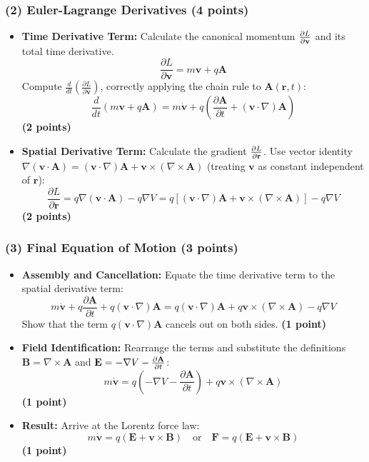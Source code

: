 \documentclass[11pt, a4paper]{article} %
\begin{document}
\subsubsection*{(2) Euler-Lagrange Derivatives (4 points)}
\begin{itemize}
    \item \textbf{Time Derivative Term:}
    Calculate the canonical momentum $\pdv{L}{\mathbf{v}}$ and its total time derivative.
    \[ \frac{\partial L}{\partial \mathbf{v}} = m\mathbf{v} + q\mathbf{A} \]
    Compute $\frac{d}{dt}(\frac{\partial L}{\partial \mathbf{v}})$, correctly applying the chain rule to $\mathbf{A}(\mathbf{r}, t)$:
    \[ \frac{d}{dt}(m\mathbf{v} + q\mathbf{A}) = m\dot{\mathbf{v}} + q\left( \frac{\partial \mathbf{A}}{\partial t} + (\mathbf{v} \cdot \nabla)\mathbf{A} \right) \]
    \hfill \textbf{(2 points)} \\

    \item \textbf{Spatial Derivative Term:}
    Calculate the gradient $\pdv{L}{\mathbf{r}}$. Use vector identity $\nabla(\mathbf{v} \cdot \mathbf{A}) = (\mathbf{v} \cdot \nabla)\mathbf{A} + \mathbf{v} \times (\nabla \times \mathbf{A})$ (treating $\mathbf{v}$ as constant independent of $\mathbf{r}$):
    \[ \frac{\partial L}{\partial \mathbf{r}} = q\nabla(\mathbf{v} \cdot \mathbf{A}) - q\nabla V = q\left[ (\mathbf{v} \cdot \nabla)\mathbf{A} + \mathbf{v} \times (\nabla \times \mathbf{A}) \right] - q\nabla V \]
    \hfill \textbf{(2 points)} \\
\end{itemize}

\subsubsection*{(3) Final Equation of Motion (3 points)}
\begin{itemize}
    \item \textbf{Assembly and Cancellation:}
    Equate the time derivative term to the spatial derivative term:
    \[ m\dot{\mathbf{v}} + q\frac{\partial \mathbf{A}}{\partial t} + q(\mathbf{v} \cdot \nabla)\mathbf{A} = q(\mathbf{v} \cdot \nabla)\mathbf{A} + q\mathbf{v} \times (\nabla \times \mathbf{A}) - q\nabla V \]
    Show that the term $q(\mathbf{v} \cdot \nabla)\mathbf{A}$ cancels out on both sides.
    \hfill \textbf{(1 point)}
    
    \item \textbf{Field Identification:}
    Rearrange the terms and substitute the definitions $\mathbf{B} = \nabla \times \mathbf{A}$ and $\mathbf{E} = -\nabla V - \pdv{\mathbf{A}}{t}$:
    \[ m\dot{\mathbf{v}} = q\left( -\nabla V - \frac{\partial \mathbf{A}}{\partial t} \right) + q\mathbf{v} \times (\nabla \times \mathbf{A}) \]
    \hfill \textbf{(1 point)}
    
    \item \textbf{Result:}
    Arrive at the Lorentz force law:
    \[ m\dot{\mathbf{v}} = q(\mathbf{E} + \mathbf{v} \times \mathbf{B}) \quad \text{or} \quad \mathbf{F} = q(\mathbf{E} + \mathbf{v} \times \mathbf{B}) \]
    \hfill \textbf{(1 point)}
\end{itemize}
\end{document}
